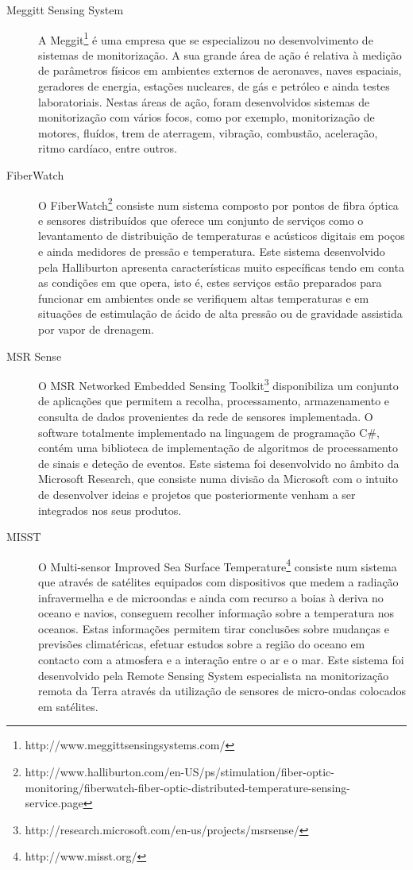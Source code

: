\begin{description}
	\item[Meggitt Sensing System] A Meggit\footnote{http://www.meggittsensingsystems.com/} é uma empresa que se especializou no desenvolvimento de sistemas de monitorização. A sua grande área de ação é relativa à medição  de parâmetros físicos em ambientes externos de aeronaves, naves espaciais, geradores de energia, estações nucleares, de gás e petróleo e ainda testes laboratoriais. Nestas áreas de ação, foram desenvolvidos sistemas de monitorização com vários focos, como por exemplo, monitorização de motores, fluídos, trem de aterragem, vibração, combustão, aceleração, ritmo cardíaco, entre outros.

	\item[FiberWatch] O FiberWatch\footnote{http://www.halliburton.com/en-US/ps/stimulation/fiber-optic-monitoring/fiberwatch-fiber-optic-distributed-temperature-sensing-service.page} consiste num sistema composto por pontos de fibra óptica e sensores distribuídos que oferece um conjunto de serviços como o levantamento de distribuição de temperaturas e acústicos digitais em poços e ainda medidores de pressão e temperatura. Este sistema desenvolvido pela Halliburton apresenta características muito específicas tendo em conta as condições em que opera, isto é, estes serviços estão preparados para funcionar em ambientes onde se verifiquem altas temperaturas e em situações de estimulação de ácido de alta pressão ou de gravidade assistida por vapor de drenagem.

	\item[MSR Sense] O MSR Networked Embedded Sensing Toolkit\footnote{http://research.microsoft.com/en-us/projects/msrsense/} disponibiliza um conjunto de aplicações que permitem a recolha, processamento, armazenamento e consulta de dados provenientes da rede de sensores implementada. O software totalmente implementado na linguagem de programação C\#, contém uma biblioteca de implementação de algoritmos de processamento de sinais e deteção de eventos. Este sistema foi desenvolvido no âmbito da Microsoft Research, que consiste numa divisão da Microsoft com o intuito de desenvolver ideias e projetos que posteriormente venham a ser integrados nos seus produtos.

	\item[MISST]  O Multi-sensor Improved Sea Surface Temperature\footnote{http://www.misst.org/} consiste num sistema que através de satélites equipados com dispositivos que medem a radiação infravermelha e de microondas e ainda com recurso a boias à deriva no oceano e navios, conseguem recolher informação sobre a temperatura nos oceanos. Estas informações permitem tirar conclusões sobre mudanças e previsões climatéricas, efetuar estudos sobre a região do oceano em contacto com a atmosfera e a interação entre o ar e o mar. Este sistema foi desenvolvido pela Remote Sensing System especialista na monitorização remota da Terra através da utilização de sensores de micro-ondas colocados em satélites.


\end{description}
